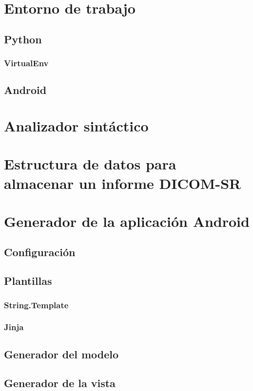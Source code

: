 \section{Entorno de trabajo}
\subsection{Python}
\subsubsection{VirtualEnv}\label{sec:virtualenv}
\subsection{Android}

\section{Analizador sintáctico}
\section{Estructura de datos para almacenar un informe DICOM-SR}

\section{Generador de la aplicación Android}
\subsection{Configuración}\label{sec:configuracion}
\subsection{Plantillas}\label{sec:templates}
\subsubsection{String.Template}
\subsubsection{Jinja}

\subsection{Generador del modelo}
\subsection{Generador de la vista}
